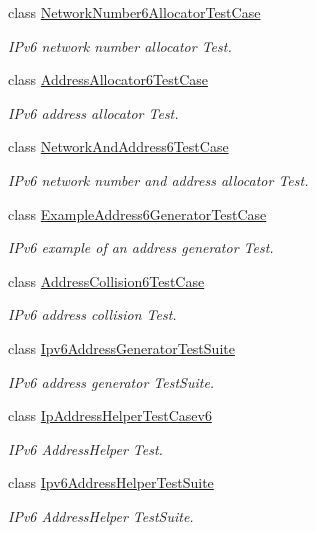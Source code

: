 \begin{DoxyCompactItemize}
class \hyperlink{classNetworkNumber6AllocatorTestCase}{Network\+Number6\+Allocator\+Test\+Case}
\begin{DoxyCompactList}\small\item\em I\+Pv6 network number allocator Test. \end{DoxyCompactList}\item 
class \hyperlink{classAddressAllocator6TestCase}{Address\+Allocator6\+Test\+Case}
\begin{DoxyCompactList}\small\item\em I\+Pv6 address allocator Test. \end{DoxyCompactList}\item 
class \hyperlink{classNetworkAndAddress6TestCase}{Network\+And\+Address6\+Test\+Case}
\begin{DoxyCompactList}\small\item\em I\+Pv6 network number and address allocator Test. \end{DoxyCompactList}\item 
class \hyperlink{classExampleAddress6GeneratorTestCase}{Example\+Address6\+Generator\+Test\+Case}
\begin{DoxyCompactList}\small\item\em I\+Pv6 example of an address generator Test. \end{DoxyCompactList}\item 
class \hyperlink{classAddressCollision6TestCase}{Address\+Collision6\+Test\+Case}
\begin{DoxyCompactList}\small\item\em I\+Pv6 address collision Test. \end{DoxyCompactList}\item 
class \hyperlink{classIpv6AddressGeneratorTestSuite}{Ipv6\+Address\+Generator\+Test\+Suite}
\begin{DoxyCompactList}\small\item\em I\+Pv6 address generator Test\+Suite. \end{DoxyCompactList}\item 
class \hyperlink{classIpAddressHelperTestCasev6}{Ip\+Address\+Helper\+Test\+Casev6}
\begin{DoxyCompactList}\small\item\em I\+Pv6 Address\+Helper Test. \end{DoxyCompactList}\item 
class \hyperlink{classIpv6AddressHelperTestSuite}{Ipv6\+Address\+Helper\+Test\+Suite}
\begin{DoxyCompactList}\small\item\em I\+Pv6 Address\+Helper Test\+Suite. \end{DoxyCompactList}\item 

\end{DoxyCompactItemize}
